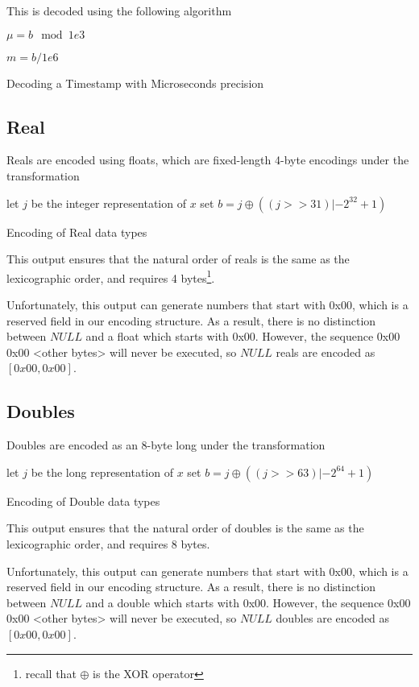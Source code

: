 This is decoded using the following algorithm

\begin{algorithm}
	$\mu = b \mod 1e3$\;

	$m = b/1e6$\;
\caption{Decoding a Timestamp with Microseconds precision}
\end{algorithm}

\subsection{Real}
Reals are encoded using floats, which are fixed-length 4-byte encodings under the transformation

\begin{algorithm}
let $j$ be the integer representation of $x$\;
set $b = j \oplus ((j>>31) | -2^{32}+1)$
\caption{Encoding of Real data types}
\end{algorithm}
This output ensures that the natural order of reals is the same as the lexicographic order, and requires 4 bytes\footnote{recall that $\oplus$ is the XOR operator}.

Unfortunately, this output can generate numbers that start with 0x00, which is a reserved field in our encoding structure. As a result, there is no distinction between $NULL$ and a float which starts with 0x00. However, the sequence 0x00 0x00 <other bytes> will never be executed, so $NULL$ reals are encoded as $[0x00,0x00]$.

\subsection{Doubles}
Doubles are encoded as an 8-byte long under the transformation

\begin{algorithm}
let $j$ be the long representation of $x$\;
set $b = j \oplus ((j>>63) | -2^{64}+1)$
\caption{Encoding of Double data types}
\end{algorithm}
This output ensures that the natural order of doubles is the same as the lexicographic order, and requires 8 bytes.

Unfortunately, this output can generate numbers that start with 0x00, which is a reserved field in our encoding structure. As a result, there is no distinction between $NULL$ and a double which starts with 0x00. However, the sequence 0x00 0x00 <other bytes> will never be executed, so $NULL$ doubles are encoded as $[0x00,0x00]$.

